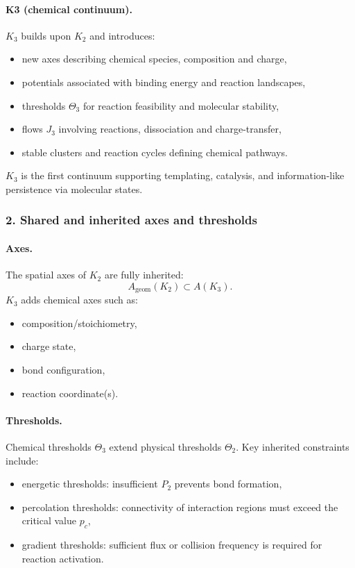 \paragraph{K3 (chemical continuum).}
$K_3$ builds upon $K_2$ and introduces:
\begin{itemize}
  \item new axes describing chemical species, composition and charge,
  \item potentials associated with binding energy and reaction landscapes,
  \item thresholds $\Theta_3$ for reaction feasibility and molecular stability,
  \item flows $J_3$ involving reactions, dissociation and charge-transfer,
  \item stable clusters and reaction cycles defining chemical pathways.
\end{itemize}

$K_3$ is the first continuum supporting templating, catalysis,
and information-like persistence via molecular states.

\subsubsection{2. Shared and inherited axes and thresholds}

\paragraph{Axes.}
The spatial axes of $K_2$ are fully inherited:
\[
A_{\mathrm{geom}}(K_2) \subset A(K_3).
\]
$K_3$ adds chemical axes such as:
\begin{itemize}
  \item composition/stoichiometry,
  \item charge state,
  \item bond configuration,
  \item reaction coordinate(s).
\end{itemize}

\paragraph{Thresholds.}
Chemical thresholds $\Theta_3$ extend physical thresholds $\Theta_2$.
Key inherited constraints include:
\begin{itemize}
  \item energetic thresholds: insufficient $P_2$ prevents bond formation,
  \item percolation thresholds: connectivity of interaction regions must
        exceed the critical value $p_c$,
  \item gradient thresholds: sufficient flux or collision frequency is
        required for reaction activation.
\end{itemize}

